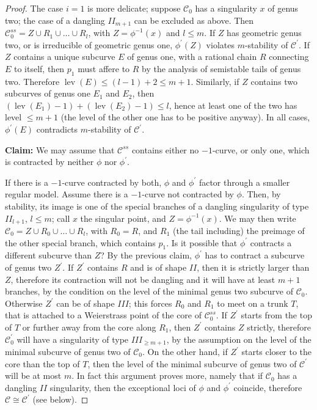 \documentclass[11pt]{amsart}
\newcommand{\lev}{\operatorname{lev}}
\theoremstyle{plain}
\theoremstyle{definition}
\begin{document}
\begin{proof}
 The case $i=1$ is more delicate; suppose $\mathcal C_0$ has a singularity $x$ of genus two; the case of a dangling $I\!I_{m+1}$ can be excluded as above. Then $\mathcal C^{ss}_0=Z\cup R_1\cup \ldots\cup R_l$, with $Z=\phi^{-1}(x)$ and $l\leq m$. If $Z$ has geometric genus two, or is irreducible of geometric genus one, $\phi^\prime(Z)$ violates $m$-stability of $\mathcal C^\prime$. If $Z$ contains a unique subcurve $E$ of genus one, with a rational chain $R$ connecting $E$ to itself, then $p_1$ must affere to $R$ by the analysis of semistable tails of genus two. Therefore $\lev(E)\leq (l-1)+2\leq m+1$. Similarly, if $Z$ contains two subcurves of genus one $E_1$ and $E_2$, then $(\lev(E_1)-1)+(\lev(E_2)-1)\leq l$, hence at least one of the two has level $\leq m+1$ (the level of the other one has to be positive anyway). In all cases, $\phi^\prime(E)$ contradicts $m$-stability of $\mathcal C^\prime$.
 
 \textbf{Claim:} We may assume that $\mathcal C^{ss}$ contains either no $-1$-curve, or only one, which is contracted by neither $\phi$ nor $\phi^\prime$.
 
 If there is a $-1$-curve contracted by both, $\phi$ and $\phi^\prime$ factor through a smaller regular model. Assume there is a $-1$-curve not contracted by $\phi$. Then, by stability, its image is one of the special branches of a dangling singularity of type $I\!I_{l+1}$, $l\leq m$; call $x$ the singular point, and $Z=\phi^{-1}(x)$. We may then write $\mathcal C_0=Z\cup R_0\cup\ldots\cup R_l$, with $R_0=R$, and $R_1$ (the tail including) the preimage of the other special branch, which contains $p_1$. Is it possible that $\phi^\prime$ contracts a different subcurve than $Z$? By the previous claim, $\phi^\prime$ has to contract a subcurve of genus two $Z^\prime$. If $Z^\prime$ contains $R$ and is of shape $I\!I$, then it is strictly larger than $Z$, therefore its contraction will not be dangling and it will have at least $m+1$ branches, by the condition on the level of the minimal genus two subcurve of $\mathcal C_0$. Otherwise $Z^\prime$ can be of shape $I\!I\!I$; this forces $R_0$ and $R_1$ to meet on a trunk $T$, that is attached to a Weierstrass point of the core of $\mathcal C^{ss}_0$. If $Z^\prime$ starts from the top of $T$ or further away from the core along $R_1$, then $Z^\prime$ contains $Z$ strictly, therefore $\mathcal C^\prime_0$ will have a singularity of type $I\!I\!I_{\geq m+1}$, by the assumption on the level of the minimal subcurve of genus two of $\mathcal C_0$. On the other hand, if $Z^\prime$ starts closer to the core than the top of $T$, then the level of the minimal subcurve of genus two of $\mathcal C^\prime$ will be at most $m$. In fact this argument proves more, namely that if $\mathcal C_0$ has a dangling $I\!I$ singularity, then the exceptional loci of $\phi$ and $\phi^\prime$ coincide, therefore $\mathcal C\cong\mathcal C^\prime$ (see below).
 

\end{proof}
\end{document}
